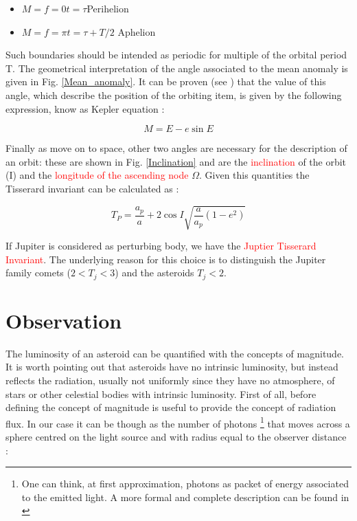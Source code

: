 \documentclass[12pt,%
               a4paper,%
               oneside,openany,%
               titlepage,%
               headinclude,footinclude,%
               BCOR5mm,%
               cleardoublepage=empty,%
               tablecaptionabove,%
               floatperchapter,
               ]{scrreprt}                 %
\begin{document}
\begin{itemize}
\item $M=f=0$\quad$t=\tau$\quad Perihelion
\item $M=f=\pi$\quad$t=\tau+T/2$ \quad Aphelion
\end{itemize}

Such boundaries should be intended as periodic for multiple of the orbital period T. The geometrical interpretation of the angle associated to the mean anomaly is given in Fig. \ref{Mean_anomaly}. It can be proven (see \cite{murray1999solar}) that the value of this angle, which describe the position of the orbiting item, is given by the following expression, know as Kepler equation \cite{murray1999solar}:

\begin{equation}
M=E-e\sin E
\end{equation}

Finally as move on to space, other two angles are necessary for the description of an orbit: these are shown in Fig. \ref{Inclination} and are the \textcolor{red}{inclination} of the orbit (I) and the \textcolor{red}{longitude of the ascending node} $\Omega$. Given this quantities the Tisserard invariant can be calculated as \cite{murray1999solar}:

\begin{equation}
T_{P}=\frac{a_{p}}{a}+2\cos I\sqrt{\dfrac{a}{a_{p}}(1-e^{2})}
\end{equation}

If Jupiter is considered as perturbing body, we have the \textcolor{red}{Juptier Tisserard Invariant}. The underlying reason for this choice is to distinguish the Jupiter family comets ($2<T_{j}<3$) and the asteroids $T_{j}<2$. 


\section{Observation}

The luminosity of an asteroid can be quantified with the concepts of magnitude. It is worth pointing out that asteroids have no intrinsic luminosity, but instead reflects the radiation, usually not uniformly since they have no atmosphere, of stars or other celestial bodies with intrinsic luminosity. 
First of all, before defining the concept of magnitude is useful to provide the concept of radiation flux. In our case it can be though as the number of photons \footnote{One can think, at first approximation, photons as packet of energy associated to the emitted light. A more formal and complete description can be found in \cite{feynman2018feynman} } that moves across a sphere centred on the light source and with radius equal to the observer distance \cite{burbine2016asteroids}:
\end{document}
